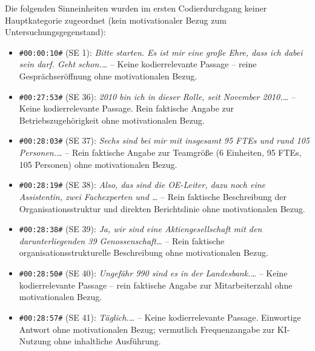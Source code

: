 {\small\color{gray}
\noindent Die folgenden Sinneinheiten wurden im ersten Codierdurchgang
keiner Hauptkategorie zugeordnet (kein motivationaler Bezug zum
Untersuchungsgegenstand):
\begin{itemize}
  \item \texttt{\#00:00:10\#} (SE 1): \textit{Bitte starten. Es ist mir eine große Ehre, dass ich dabei sein darf. Geht schon.\ldots} -- Keine kodierrelevante Passage – reine Gesprächseröffnung ohne motivationalen Bezug.
  \item \texttt{\#00:27:53\#} (SE 36): \textit{2010 bin ich in dieser Rolle, seit November 2010.\ldots} -- Keine kodierrelevante Passage. Rein faktische Angabe zur Betriebszugehörigkeit ohne motivationalen Bezug.
  \item \texttt{\#00:28:03\#} (SE 37): \textit{Sechs sind bei mir mit insgesamt 95 FTEs und rund 105 Personen.\ldots} -- Rein faktische Angabe zur Teamgröße (6 Einheiten, 95 FTEs, 105 Personen) ohne motivationalen Bezug.
  \item \texttt{\#00:28:19\#} (SE 38): \textit{Also, das sind die OE-Leiter, dazu noch eine Assistentin, zwei Fachexperten und \ldots} -- Rein faktische Beschreibung der Organisationsstruktur und direkten Berichtslinie ohne motivationalen Bezug.
  \item \texttt{\#00:28:38\#} (SE 39): \textit{Ja, wir sind eine Aktiengesellschaft mit den darunterliegenden 39 Genossenschaft\ldots} -- Rein faktische organisationsstrukturelle Beschreibung ohne motivationalen Bezug.
  \item \texttt{\#00:28:50\#} (SE 40): \textit{Ungefähr 990 sind es in der Landesbank.\ldots} -- Keine kodierrelevante Passage – rein faktische Angabe zur Mitarbeiterzahl ohne motivationalen Bezug.
  \item \texttt{\#00:28:57\#} (SE 41): \textit{Täglich.\ldots} -- Keine kodierrelevante Passage. Einwortige Antwort ohne motivationalen Bezug; vermutlich Frequenzangabe zur KI-Nutzung ohne inhaltliche Ausführung.
\end{itemize}
}
